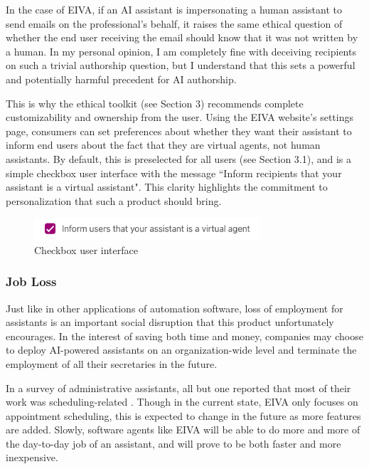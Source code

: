 \documentclass{article}
\begin{document}
In the case of EIVA, if an AI assistant is impersonating a human assistant to send emails on the professional's behalf, it raises the same ethical question of whether the end user receiving the email should know that it was not written by a human. In my personal opinion, I am completely fine with deceiving recipients on such a trivial authorship question, but I understand that this sets a powerful and potentially harmful precedent for AI authorship.

This is why the ethical toolkit (see Section 3) recommends complete customizability and ownership from the user. Using the EIVA website's settings page, consumers can set preferences about whether they want their assistant to inform end users about the fact that they are virtual agents, not human assistants. By default, this is preselected for all users (see Section 3.1), and is a simple checkbox user interface with the message ``Inform recipients that your assistant is a virtual assistant". This clarity highlights the commitment to personalization that such a product should bring.

\begin{figure}[h]
 \centering
 \includegraphics[width=0.75\textwidth]{checkbox.png}
 \caption{Checkbox user interface}
 \label{fig:checkbox}
\end{figure}

\subsubsection{Job Loss}

Just like in other applications of automation software, loss of employment for assistants is an important social disruption that this product unfortunately encourages. In the interest of saving both time and money, companies may choose to deploy AI-powered assistants on an organization-wide level and terminate the employment of all their secretaries in the future.

In a survey of administrative assistants, all but one reported that most of their work was scheduling-related \cite{erickson_assistance:_2008}. Though in the current state, EIVA only focuses on appointment scheduling, this is expected to change in the future as more features are added. Slowly, software agents like EIVA will be able to do more and more of the day-to-day job of an assistant, and will prove to be both faster and more inexpensive.
\end{document}
